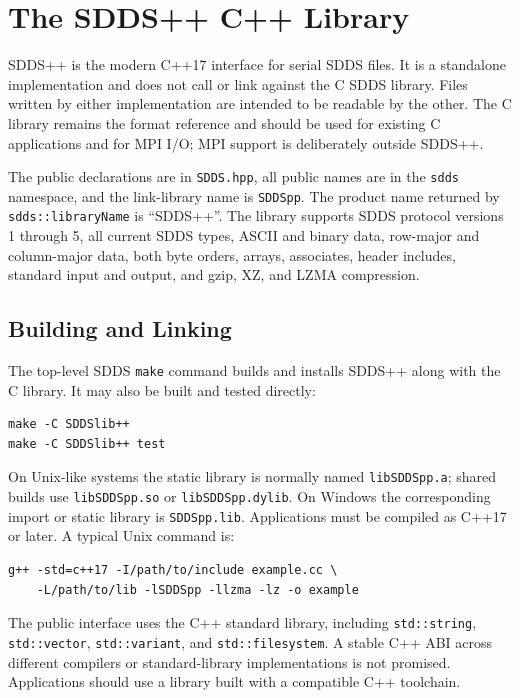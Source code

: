 \documentclass[11pt]{article}
\begin{document}
\section{The SDDS++ C++ Library}
\label{sect:sddspp}

SDDS++ is the modern C++17 interface for serial SDDS files.  It is a standalone
implementation and does not call or link against the C SDDS library.  Files
written by either implementation are intended to be readable by the other.
The C library remains the format reference and should be used for existing C
applications and for MPI I/O; MPI support is deliberately outside SDDS++.

The public declarations are in \verb|SDDS.hpp|, all public names are in the
{\tt sdds} namespace, and the link-library name is {\tt SDDSpp}.  The product
name returned by {\tt sdds::libraryName} is ``SDDS++''.  The library supports
SDDS protocol versions 1 through 5, all current SDDS types, ASCII and binary
data, row-major and column-major data, both byte orders, arrays, associates,
header includes, standard input and output, and gzip, XZ, and LZMA compression.

\subsection{Building and Linking}

The top-level SDDS {\tt make} command builds and installs SDDS++ along with the
C library.  It may also be built and tested directly:

\begin{verbatim}
make -C SDDSlib++
make -C SDDSlib++ test
\end{verbatim}

On Unix-like systems the static library is normally named
{\tt libSDDSpp.a}; shared builds use {\tt libSDDSpp.so} or
{\tt libSDDSpp.dylib}.  On Windows the corresponding import or static library
is {\tt SDDSpp.lib}.  Applications must be compiled as C++17 or later.  A
typical Unix command is:

\begin{verbatim}
g++ -std=c++17 -I/path/to/include example.cc \
    -L/path/to/lib -lSDDSpp -llzma -lz -o example
\end{verbatim}

The public interface uses the C++ standard library, including
{\tt std::string}, {\tt std::vector}, {\tt std::variant}, and
{\tt std::filesystem}.  A stable C++ ABI across different compilers or
standard-library implementations is not promised.  Applications should use a
library built with a compatible C++ toolchain.
\end{document}
